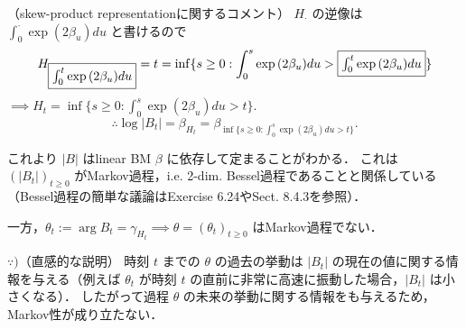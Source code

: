 \documentclass{jsarticle}
\begin{document}
（skew-product representationに関するコメント）
$H_{\cdot}$ の逆像は $\int_0^{\cdot}\exp{(2\beta_u)}du$ と書けるので
\begin{align}
    H_{\fbox{$\int_0^t\exp{(2\beta_u)}du$}}
    = t
    = \inf\{s\ge0:\int_0^s\exp{(2\beta_u)}du>\fbox{$\int_0^t\exp{(2\beta_u)}du$}\}
\end{align}
$\implies H_t = \inf\{s\ge0:\int_0^s\exp{(2\beta_u)}du>t\}.$
$$
\therefore 
\log{\lvert B_t\rvert}
= \beta_{H_t}
= \beta_{\inf\{s\ge0:\int_0^s\exp{(2\beta_u)}du>t\}}.
$$

これより $\lvert B\rvert$ はlinear BM $\beta$ に依存して定まることがわかる．
これは $(\lvert B_t\rvert)_{t\ge0}$ がMarkov過程，i.e. 2-dim. Bessel過程であることと関係している（Bessel過程の簡単な議論はExercise 6.24やSect. 8.4.3を参照）．

一方，$\theta_t:=\arg B_t=\gamma_{H_t}\implies \theta=(\theta_t)_{t\ge0}$ はMarkov過程でない．

\begin{screen}
    $\because)$（直感的な説明）
    時刻 $t$ までの $\theta$ の過去の挙動は $\lvert B_t\rvert$ の現在の値に関する情報を与える（例えば $\theta_t$ が時刻 $t$ の直前に非常に高速に振動した場合，$\lvert B_t\rvert$ は小さくなる）．
    したがって過程 $\theta$ の未来の挙動に関する情報をも与えるため，Markov性が成り立たない．
\end{screen}
\end{document}
